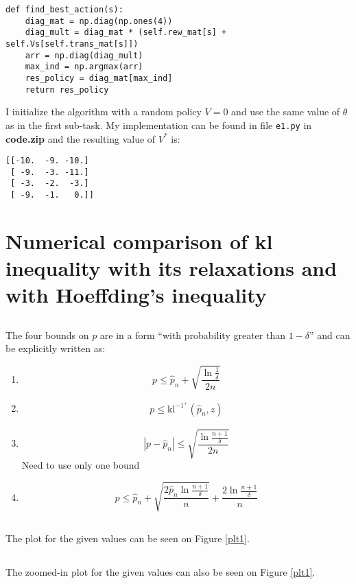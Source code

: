 \documentclass[a4paper]{article}
\begin{document}
\begin{lstlisting}[caption="Calculation of argmax\_a", label=lst1]
def find_best_action(s):
    diag_mat = np.diag(np.ones(4))
    diag_mult = diag_mat * (self.rew_mat[s] + self.Vs[self.trans_mat[s]])
    arr = np.diag(diag_mult)
    max_ind = np.argmax(arr)
    res_policy = diag_mat[max_ind]
    return res_policy
\end{lstlisting}
I initialize the algorithm with a random policy $V=0$ and use the same value of
$\theta$ as in the first sub-task. My implementation can be found in file
\texttt{e1.py} in \textbf{code.zip} and the resulting value of $V^{*}$ is:
\begin{verbatim}
[[-10.  -9. -10.]
 [ -9.  -3. -11.]
 [ -3.  -2.  -3.]
 [ -9.  -1.   0.]]
\end{verbatim}


\section{Numerical comparison of kl inequality with its relaxations and with Hoeffding’s inequality}
\subsection{}
\label{subsec:21}
The four bounds on $p$ are in a form ``with probability greater than $1 - \delta$'' and can
be explicitly written as:
\begin{enumerate}
\item $$p \leq \hat{p}_n+\sqrt{\frac{\ln \frac{1}{\delta}}{2 n}}$$
\item
  \begin{align*}
  p \leq \mathrm{kl}^{-1^{+}}\left(\hat{p}_{n}, z\right)
  \end{align*}
\item $$|p-\hat{p}_n| \leq \sqrt{\frac{\ln \frac{n+1}{\delta}}{2 n}}$$
  Need to use only one bound
\item $$ p \leq \hat{p}_n+\sqrt{\frac{2 \hat{p}_n \ln \frac{n+1}{\delta}}{n}}+\frac{2
  \ln \frac{n+1}{\delta}}{n}$$
\end{enumerate}

\subsection{}
\label{subsec:22}
The plot for the given values can be seen on Figure \ref{plt1}.

\subsection{}
\label{subsec:23}
The zoomed-in plot for the given values can also be seen on Figure \ref{plt1}.
\end{document}
